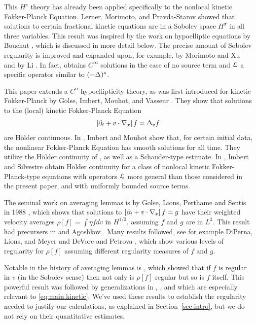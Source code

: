 This $H^s$ theory has already been applied specifically to the nonlocal kinetic Fokker-Planck Equation.  Lerner, Morimoto, and Pravda-Starov \cite{LeMoPr} showed that solutions to certain fractional kinetic equations are in a Sobolev space $H^\sigma$ in all three variables.  This result was inspired by the work on hypoelliptic equations by Bouchut \cite{Bo}, which is discussed in more detail below.  The precise amount of Sobolev regularity is improved and expanded upon, for example, by Morimoto and Xu \cite{MoXu} and by Li \cite{Li}.  In fact, \cite{MoXu} obtains $C^\infty$ solutions in the case of no source term and $\mathcal{L}$ a specific operator similar to $(-\Delta)^s$.  

This paper extends a $C^\alpha$ hypoellipticity theory, as was first introduced for kinetic Fokker-Planck by Golse, Imbert, Mouhot, and Vasseur \cite{GoImMoVa}.  They show that solutions to the (local) kinetic Fokker-Planck Equation
\[ \left[ \partial_t + v\cdot \nabla_x \right] f = \Delta_v f \]
are H\"{o}lder continuous.  In \cite{ImMo}, Imbert and Mouhot show that, for certain initial data, the nonlinear Fokker-Planck Equation has smooth solutions for all time.  They utilize the H\"{o}lder continuity of \cite{GoImMoVa}, as well as a Schauder-type estimate.  In \cite{ImSi}, Imbert and Silvestre obtain H\"{o}lder continuity for a class of nonlocal kinetic Fokker-Planck-type equations with operators $\mathcal{L}$ more general than those considered in the present paper, and with uniformly bounded source terms.  

The seminal work on averaging lemmas is by Golse, Lions, Perthame and Sentis in 1988 \cite{GoLiPeSe}, which shows that solutions to $\left[ \partial_t + v\cdot \nabla_x \right] f = g$ have their weighted velocity averages $\rho[f] = \int \eta f dv$ in $H^{1/2}$, assuming $f$ and $g$ are in $L^2$.  This result had precursers in \cite{GoPeSe} and Agoshkov \cite{Ag}.  Many results followed, see for example DiPerna, Lions, and Meyer \cite{DiLiMe} and DeVore and Petrova \cite{DePe}, which show various levels of regularity for $\rho[f]$ assuming different regularity measures of $f$ and $g$.  

Notable in the history of averaging lemmas is \cite{Bo}, which showed that if $f$ is regular in $v$ (in the Sobolev sense) then not only is $\rho[f]$ regular but so is $f$ itself.  This powerful result was followed by generalizations in \cite{LeMoPr}, \cite{MoXu}, and \cite{Li} which are especially relevant to \eqref{eq:main.kinetic}.  We've used these results to establish the regularity needed to justify our calculations, as explained in Section~\ref{sec:intro}, but we do not rely on their quantitative estimates.  

